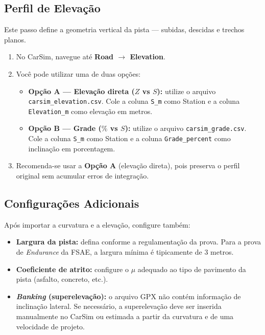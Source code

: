 \documentclass[a4paper,12pt]{article}
\begin{document}
\subsection{Perfil de Elevação}

Este passo define a geometria vertical da pista --- subidas, descidas e trechos planos.

\begin{enumerate}
    \item No CarSim, navegue até \textbf{Road $\rightarrow$ Elevation}.
    \item Você pode utilizar uma de duas opções:
    \begin{itemize}
        \item \textbf{Opção A --- Elevação direta ($Z$ vs $S$):} utilize o arquivo \texttt{carsim\_elevation.csv}. Cole a coluna \texttt{S\_m} como Station e a coluna \texttt{Elevation\_m} como elevação em metros.
        \item \textbf{Opção B --- Grade ($\%$ vs $S$):} utilize o arquivo \texttt{carsim\_grade.csv}. Cole a coluna \texttt{S\_m} como Station e a coluna \texttt{Grade\_percent} como inclinação em porcentagem.
    \end{itemize}
    \item Recomenda-se usar a \textbf{Opção A} (elevação direta), pois preserva o perfil original sem acumular erros de integração.
\end{enumerate}

\subsection{Configurações Adicionais}

Após importar a curvatura e a elevação, configure também:

\begin{itemize}
    \item \textbf{Largura da pista:} defina conforme a regulamentação da prova. Para a prova de \textit{Endurance} da FSAE, a largura mínima é tipicamente de 3 metros.
    \item \textbf{Coeficiente de atrito:} configure o $\mu$ adequado ao tipo de pavimento da pista (asfalto, concreto, etc.).
    \item \textbf{\textit{Banking} (superelevação):} o arquivo GPX não contém informação de inclinação lateral. Se necessário, a superelevação deve ser inserida manualmente no CarSim ou estimada a partir da curvatura e de uma velocidade de projeto.
\end{itemize}
\end{document}

